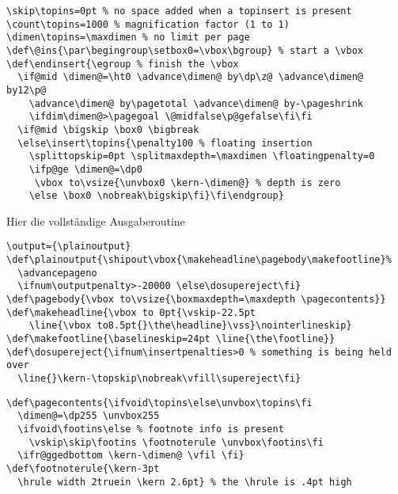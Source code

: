 \begin{appendix}
\begin{verbatim}
\skip\topins=0pt % no space added when a topinsert is present
\count\topins=1000 % magnification factor (1 to 1)
\dimen\topins=\maxdimen % no limit per page
\def\@ins{\par\begingroup\setbox0=\vbox\bgroup} % start a \vbox
\def\endinsert{\egroup % finish the \vbox
  \if@mid \dimen@=\ht0 \advance\dimen@ by\dp\z@ \advance\dimen@ by12\p@
    \advance\dimen@ by\pagetotal \advance\dimen@ by-\pageshrink
    \ifdim\dimen@>\pagegoal \@midfalse\p@gefalse\fi\fi
  \if@mid \bigskip \box0 \bigbreak
  \else\insert\topins{\penalty100 % floating insertion
    \splittopskip=0pt \splitmaxdepth=\maxdimen \floatingpenalty=0
    \ifp@ge \dimen@=\dp0
     \vbox to\vsize{\unvbox0 \kern-\dimen@} % depth is zero
    \else \box0 \nobreak\bigskip\fi}\fi\endgroup}
\end{verbatim}
Hier die vollst\"andige Ausgaberoutine
\begin{verbatim}
\output={\plainoutput}
\def\plainoutput{\shipout\vbox{\makeheadline\pagebody\makefootline}%
  \advancepageno
  \ifnum\outputpenalty>-20000 \else\dosupereject\fi}
\def\pagebody{\vbox to\vsize{\boxmaxdepth=\maxdepth \pagecontents}}
\def\makeheadline{\vbox to 0pt{\vskip-22.5pt
    \line{\vbox to8.5pt{}\the\headline}\vss}\nointerlineskip}
\def\makefootline{\baselineskip=24pt \line{\the\footline}}
\def\dosupereject{\ifnum\insertpenalties>0 % something is being held over
  \line{}\kern-\topskip\nobreak\vfill\supereject\fi}
\end{verbatim}
\begin{verbatim}
\def\pagecontents{\ifvoid\topins\else\unvbox\topins\fi
  \dimen@=\dp255 \unvbox255
  \ifvoid\footins\else % footnote info is present
    \vskip\skip\footins \footnoterule \unvbox\footins\fi
  \ifr@ggedbottom \kern-\dimen@ \vfil \fi}
\def\footnoterule{\kern-3pt
  \hrule width 2truein \kern 2.6pt} % the \hrule is .4pt high
\end{verbatim}

\end{appendix}
